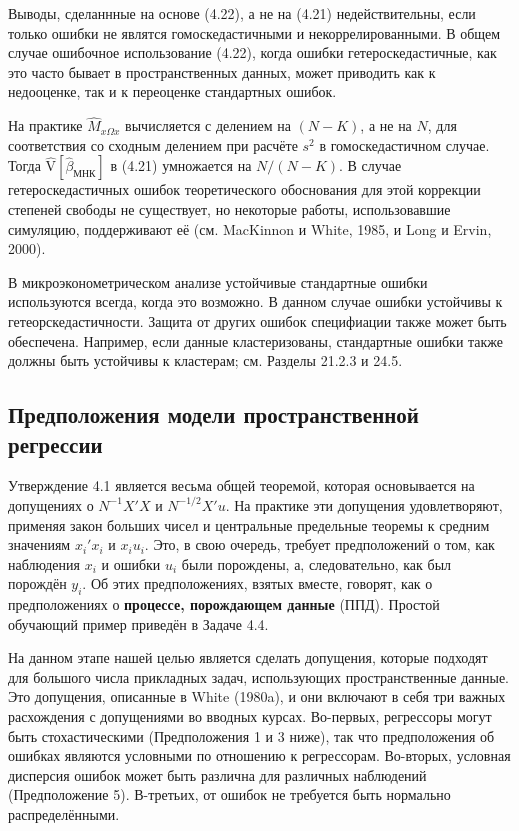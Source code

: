 Выводы, сделаннные на основе (4.22), а не на (4.21) недействительны, если только ошибки не являтся гомоскедастичными и некоррелированными. В общем случае ошибочное использование (4.22), когда ошибки гетероскедастичные, как это часто бывает в пространственных данных, может приводить как к недооценке, так и к переоценке стандартных ошибок.

На практике $\hat{M}_{x \Omega x}$ вычисляется с делением на $(N-K)$, а не на $N$, для соответствия со сходным делением при расчёте $s^2$ в гомоскедастичном случае. Тогда $\mathrm{\hat{V}}[\hat{\beta}_{\text{МНК}}]$ в (4.21) умножается на $N/(N-K)$. В случае гетероскедастичных ошибок теоретического обоснования для этой коррекции степеней свободы не существует, но некоторые работы, использовавшие симуляцию, поддерживают её (см. MacKinnon и White, 1985, и Long и Ervin, 2000).

В микроэконометрическом анализе устойчивые стандартные ошибки используются всегда, когда это возможно. В данном случае ошибки устойчивы к гетеорскедастичности. Защита от других ошибок специфиации также может быть обеспечена. Например, если данные кластеризованы, стандартные ошибки также должны быть устойчивы к кластерам; см. Разделы 21.2.3 и 24.5.

\subsection{Предположения модели пространственной регрессии}

Утверждение 4.1 является весьма общей теоремой, которая основывается на допущениях о $N^{-1}X'X$ и $N^{-1/2}X'u$. На практике эти допущения удовлетворяют, применяя закон больших чисел и центральные предельные теоремы к средним значениям $x_i'x_i$ и $x_i u_i$. Это, в свою очередь, требует предположений о том, как наблюдения $x_i$ и ошибки $u_i$ были порождены, а, следовательно, как был порождён $y_i$. Об этих предположениях, взятых вместе, говорят, как о предположениях о \textbf{процессе, порождающем данные} (ППД). Простой обучающий пример приведён в Задаче 4.4.

На данном этапе нашей целью является сделать допущения, которые подходят для большого числа прикладных задач, использующих пространственные данные. Это допущения, описанные в White (1980a), и они включают в себя три важных расхождения с допущениями во вводных курсах. Во-первых, регрессоры могут быть стохастическими (Предположения 1 и 3 ниже), так что предположения об ошибках являются условными по отношению к регрессорам. Во-вторых, условная дисперсия ошибок может быть различна для различных наблюдений (Предположение 5). В-третьих, от ошибок не требуется быть нормально распределёнными.

